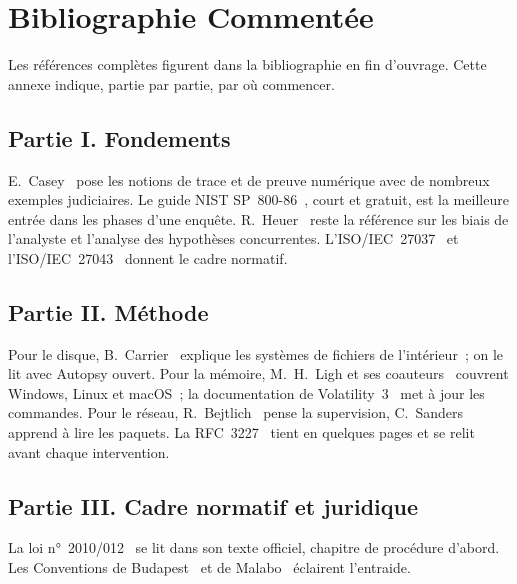 
\chapter{Bibliographie Commentée}
\label{ann:bibliographie}

Les références complètes figurent dans la bibliographie en fin d'ouvrage.
Cette annexe indique, partie par partie, par où commencer.

\section*{Partie I. Fondements}

E.~Casey~\cite{casey2004} pose les notions de trace et de preuve numérique
avec de nombreux exemples judiciaires. Le guide NIST SP~800-86~\cite{nist80086},
court et gratuit, est la meilleure entrée dans les phases d'une enquête.
R.~Heuer~\cite{heuer1999} reste la référence sur les biais de l'analyste et
l'analyse des hypothèses concurrentes. L'ISO/IEC~27037~\cite{iso27037_2012}
et l'ISO/IEC~27043~\cite{iso27043_2015} donnent le cadre normatif.

\section*{Partie II. Méthode}

Pour le disque, B.~Carrier~\cite{carrier2005} explique les systèmes de
fichiers de l'intérieur~; on le lit avec Autopsy ouvert. Pour la mémoire,
M.~H.~Ligh et ses coauteurs~\cite{ligh2014memory} couvrent Windows, Linux et
macOS~; la documentation de Volatility~3~\cite{volatility3} met à jour les
commandes. Pour le réseau, R.~Bejtlich~\cite{bejtlich2013nsm} pense la
supervision, C.~Sanders~\cite{sanders2017packet} apprend à lire les paquets.
La RFC~3227~\cite{rfc3227} tient en quelques pages et se relit avant chaque
intervention.

\section*{Partie III. Cadre normatif et juridique}

La loi n°~2010/012~\cite{loi2010012} se lit dans son texte officiel,
chapitre de procédure d'abord. Les Conventions de
Budapest~\cite{budapest2001} et de Malabo~\cite{ua2014malabo} éclairent
l'entraide.

